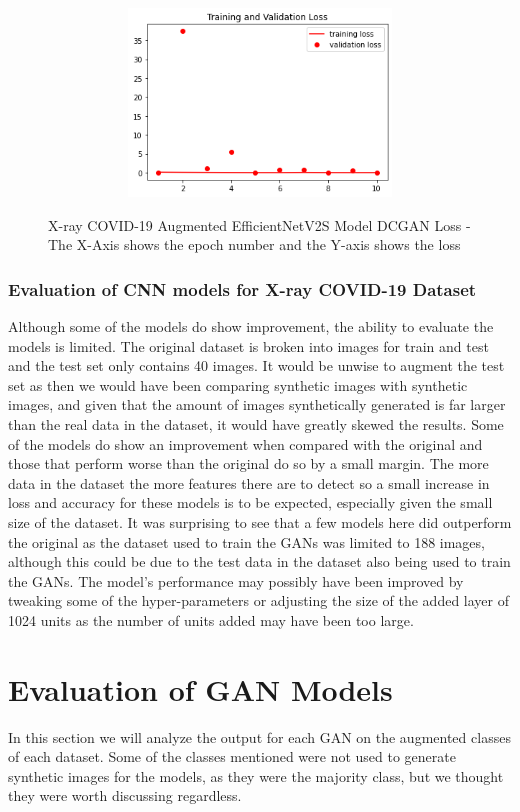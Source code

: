  \begin{figure}[H]
    \centering
    \includegraphics[width=1\textwidth,height=5cm,keepaspectratio]{Images/EfficientNetV2SBaselineTrainingValidationLossXRayCOVID19AugmentedDCGAN.png}\\
    \caption{X-ray COVID-19 Augmented EfficientNetV2S Model DCGAN Loss - The X-Axis shows the epoch number and the Y-axis shows the loss}
    \label{fig:X-ray COVID-19 Augmented EfficientNetV2S Model DCGAN Loss}
\end{figure}
\subsubsection{Evaluation of CNN models for X-ray COVID-19 Dataset}
Although some of the models do show improvement, the ability to evaluate the models is limited.  The original dataset is broken into images for train and test and the test set only contains 40 images.  It would be unwise to augment the test set as then we would have been comparing synthetic images with synthetic images, and given that the amount of images synthetically generated is far larger than the real data in the dataset, it would have greatly skewed the results.  Some of the models do show an improvement when compared with the original and those that perform worse than the original do so by a small margin.  The more data in the dataset the more features there are to detect so a small increase in loss and accuracy for these models is to be expected, especially given the small size of the dataset.  It was surprising to see that a few models here did outperform the original as the dataset used to train the GANs was limited to 188 images, although this could be due to the test data in the dataset also being used to train the GANs.  The model's performance may possibly have been improved by tweaking some of the hyper-parameters or adjusting the size of the added layer of 1024 units as the number of units added may have been too large.
\section{Evaluation of GAN Models}
In this section we will analyze the output for each GAN on the augmented classes of each dataset.  Some of the classes mentioned were not used to generate synthetic images for the models, as they were the majority class, but we thought they were worth discussing regardless.
